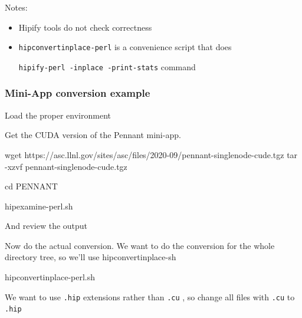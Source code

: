 \documentclass[
]{article}
\providecommand{\tightlist}{%
  \setlength{\itemsep}{0pt}\setlength{\parskip}{0pt}}
\let\oldtexttt\texttt
\renewcommand{\texttt}[1]{
  \colorbox{Light}{\oldtexttt{#1}}
}
\newenvironment{Shaded}{}{}
\newcommand{\BuiltInTok}[1]{#1}
\newcommand{\ExtensionTok}[1]{#1}
\newcommand{\FunctionTok}[1]{\textcolor[rgb]{0.02,0.16,0.49}{#1}}
\newcommand{\NormalTok}[1]{#1}
\newcommand{\VariableTok}[1]{\textcolor[rgb]{0.10,0.09,0.49}{#1}}
\providecommand{\tightlist}{%
  \setlength{\itemsep}{0pt}\setlength{\parskip}{0pt}}
\begin{document}
Notes:

\begin{itemize}
\tightlist
\item
  Hipify tools do not check correctness
\item
  \texttt{hipconvertinplace-perl} is a convenience script that does
  \texttt{hipify-perl\ -inplace\ -print-stats} command
\end{itemize}

\hypertarget{mini-app-conversion-example}{%
\subsubsection{Mini-App conversion
example}\label{mini-app-conversion-example}}

Load the proper environment

\begin{Shaded}
\end{Shaded}

Get the CUDA version of the Pennant mini-app.

\begin{Shaded}
\begin{Highlighting}[]
\FunctionTok{wget}\NormalTok{ https://asc.llnl.gov/sites/asc/files/2020{-}09/pennant{-}singlenode{-}cude.tgz}
\FunctionTok{tar}\NormalTok{ {-}xzvf pennant{-}singlenode{-}cude.tgz}

\BuiltInTok{cd}\NormalTok{ PENNANT}

\ExtensionTok{hipexamine{-}perl.sh}
\end{Highlighting}
\end{Shaded}

And review the output

Now do the actual conversion. We want to do the conversion for the whole
directory tree, so we'll use hipconvertinplace-sh

\begin{Shaded}
\begin{Highlighting}[]
\ExtensionTok{hipconvertinplace{-}perl.sh}
\end{Highlighting}
\end{Shaded}

We want to use \texttt{.hip} extensions rather than \texttt{.cu}, so
change all files with \texttt{.cu} to \texttt{.hip}
\end{document}
